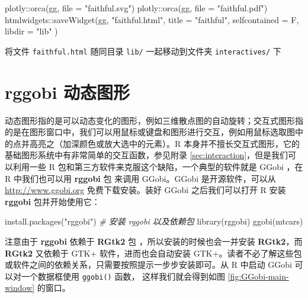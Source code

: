 \documentclass[
  b5paper,
  UTF8,twoside]{book}
\newenvironment{Shaded}{\begin{snugshade}}{\end{snugshade}}
\newcommand{\AttributeTok}[1]{\textcolor[rgb]{0.77,0.63,0.00}{#1}}
\newcommand{\CommentTok}[1]{\textcolor[rgb]{0.56,0.35,0.01}{\textit{#1}}}
\newcommand{\FunctionTok}[1]{\textcolor[rgb]{0.00,0.00,0.00}{#1}}
\newcommand{\NormalTok}[1]{#1}
\newcommand{\SpecialCharTok}[1]{\textcolor[rgb]{0.00,0.00,0.00}{#1}}
\newcommand{\StringTok}[1]{\textcolor[rgb]{0.31,0.60,0.02}{#1}}
\begin{document}
\begin{Shaded}
\begin{Highlighting}[]
\NormalTok{plotly}\SpecialCharTok{::}\FunctionTok{orca}\NormalTok{(gg, }\AttributeTok{file =} \StringTok{"faithful.svg"}\NormalTok{)}
\NormalTok{plotly}\SpecialCharTok{::}\FunctionTok{orca}\NormalTok{(gg, }\AttributeTok{file =} \StringTok{"faithful.pdf"}\NormalTok{)}
\NormalTok{htmlwidgets}\SpecialCharTok{::}\FunctionTok{saveWidget}\NormalTok{(gg, }\StringTok{"faithful.html"}\NormalTok{,}
  \AttributeTok{title =} \StringTok{"faithful"}\NormalTok{,}
  \AttributeTok{selfcontained =}\NormalTok{ F, }\AttributeTok{libdir =} \StringTok{"lib"}
\NormalTok{)}
\end{Highlighting}
\end{Shaded}

将文件 \texttt{faithful.html} 随同目录 \texttt{lib/} 一起移动到文件夹 \texttt{interactives/} 下

\hypertarget{sec:dynamic-graphics}{%
\section{rggobi 动态图形}\label{sec:dynamic-graphics}}

动态图形指的是可以动态变化的图形，例如三维散点图的自动旋转；交互式图形指的是在图形窗口中，我们可以用鼠标或键盘和图形进行交互，例如用鼠标选取图中的点并高亮之（加深颜色或放大选中的元素）。R 本身并不擅长交互式图形，它的基础图形系统中有非常简单的交互函数，参见附录 \ref{sec:interaction}，但是我们可以利用一些 R 包和第三方软件来克服这个缺陷，一个典型的软件就是 GGobi \citep{Cook07}，在 R 中我们也可以用 \textbf{rggobi} 包 \citep{rggobi} 来调用 GGobi。GGobi 是开源软件，可以从 \url{http://www.ggobi.org} 免费下载安装。装好 GGobi 之后我们可以打开 R 安装 \textbf{rggobi} 包并开始使用它：

\begin{Shaded}
\begin{Highlighting}[]
\FunctionTok{install.packages}\NormalTok{(}\StringTok{"rggobi"}\NormalTok{) }\CommentTok{\# 安装 rggobi 以及依赖包}
\FunctionTok{library}\NormalTok{(rggobi)}
\FunctionTok{ggobi}\NormalTok{(mtcars)}
\end{Highlighting}
\end{Shaded}

注意由于 \textbf{rggobi} 依赖于 \textbf{RGtk2} 包 \citep{RGtk2}，所以安装的时候也会一并安装 \textbf{RGtk2}，而 \textbf{RGtk2} 又依赖于 GTK+ 软件，进而也会自动安装 GTK+。读者不必了解这些包或软件之间的依赖关系，只需要按照提示一步步安装即可。从 R 中启动 GGobi 可以对一个数据框使用 \texttt{ggobi()} 函数， 这样我们就会得到如图 \ref{fig:GGobi-main-window} 的窗口。
\end{document}

